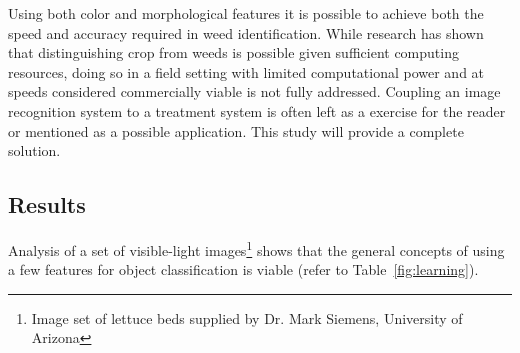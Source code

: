 \documentclass[12pt]{article}
\begin{document}
Using both color and morphological features it is possible to achieve both the speed and accuracy required in weed identification. While research has shown that distinguishing crop from weeds is possible given sufficient computing resources, doing so in a field setting with limited computational power and at speeds considered commercially viable is not fully addressed. Coupling an image recognition system to a treatment system is often left as a exercise for the reader or mentioned as a possible application. This study will provide a complete solution.


\subsection{Results}
Analysis of a set of visible-light images\footnote{Image set of lettuce beds supplied by Dr. Mark Siemens, University of Arizona} shows that the general concepts of using a few features for object classification is viable (refer to Table~\ref{fig:learning}).
\end{document}
